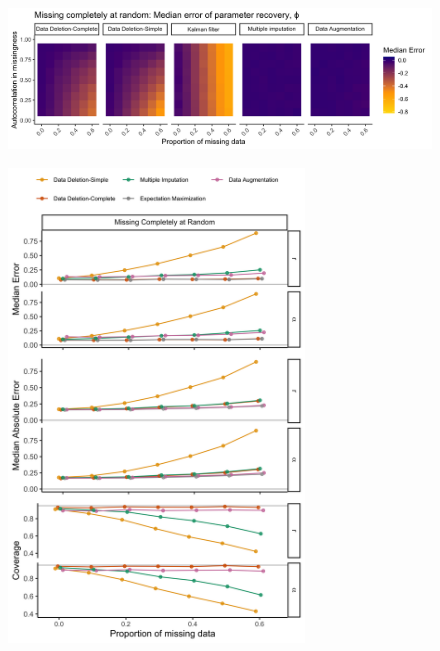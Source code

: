 \documentclass[12pt,english]{article} %
\begin{document}
\begin{linenumbers}
\begin{spacing}{1.9}
\begin{flushleft}
\begin{figure}
    \label{fig:ParamRec_Gauss}
\end{figure}

\clearpage

\begin{figure}
    \noindent\includegraphics[width = \textwidth]{Figures/MockedUpFigures/heatmap_GaussianMCAR_justPhi.png}

    \caption{}

    \label{fig:heatMap_gauss_MAR}
\end{figure}

\pagebreak

\begin{figure}
    \centering
    \noindent\includegraphics[width = 0.7\textwidth]{Figures/MockedUpFigures/parameterRecoveryPoisson_MCARlong.png}
    \caption{}


\end{figure}
\end{flushleft}
\end{spacing}
\end{linenumbers}
\end{document}
